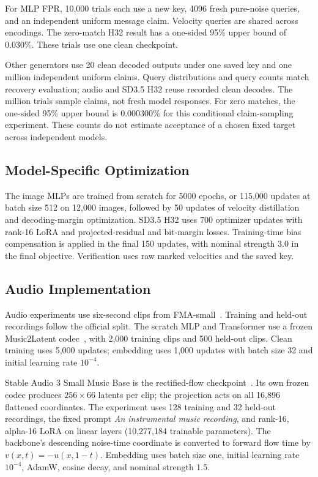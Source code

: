 \documentclass[11pt]{article}
\begin{document}
For MLP FPR, 10,000 trials each use a new key, 4096 fresh pure-noise
queries, and an independent uniform message claim. Velocity queries are
shared across encodings. The zero-match H32 result has a one-sided
95\% upper bound of $0.030\%$. These trials use one clean checkpoint.

Other generators use 20 clean decoded outputs under one saved key and
one million independent uniform claims. Query distributions and query counts
match recovery evaluation; audio and SD3.5 H32 reuse recorded clean
decodes. The million trials sample claims, not fresh model responses.
For zero matches, the one-sided 95\% upper bound is $0.000300\%$ for
this conditional claim-sampling experiment. These counts do not
estimate acceptance of a chosen fixed target across independent models.

\subsection{Model-Specific Optimization}

The image MLPs are trained from scratch for 5000 epochs, or 115,000 updates
at batch size 512 on 12,000 images, followed by 50 updates of velocity
distillation and decoding-margin optimization. SD3.5 H32 uses 700
optimizer updates with rank-16 LoRA and projected-residual and
bit-margin losses. Training-time bias compensation is applied in the
final 150 updates, with nominal strength 3.0 in the final objective.
Verification uses raw marked velocities and the saved key.

\subsection{Audio Implementation}\label{app:audio-results}

Audio experiments use six-second clips from FMA-small~\cite{fmadataset}.
Training and held-out recordings follow the official split. The scratch
MLP and Transformer use a frozen Music2Latent codec~\cite{music2latent},
with 2,000 training clips and 500 held-out clips. Clean training uses 5,000
updates; embedding uses 1,000 updates with batch size 32 and initial
learning rate $10^{-4}$.

Stable Audio 3 Small Music Base is the rectified-flow
checkpoint~\cite{stableaudio3base}. Its own frozen codec produces
$256\times66$ latents per clip; the projection acts on all 16,896
flattened coordinates. The experiment uses 128 training and 32 held-out
recordings, the fixed prompt \textit{An instrumental music recording},
and rank-16, alpha-16 LoRA on linear layers (10,277,184 trainable
parameters). The backbone's descending noise-time coordinate is
converted to forward flow time by $v(x,t)=-u(x,1-t)$.
Embedding uses batch size one, initial learning rate $10^{-4}$,
AdamW, cosine decay, and nominal strength 1.5.
\end{document}

